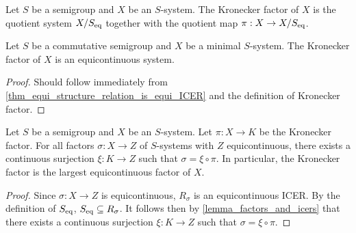 \begin{definition}
\label{def_kronecker_factor}
    Let $S$ be a semigroup and $X$ be an $S$-system.  The Kronecker factor of $X$ is the quotient system $X/S_\text{eq}$ together with the quotient map $\pi: X \to X/S_\text{eq}$.
\end{definition}

\begin{theorem}
    \label{thm_kronecker_is_equicontinuous_system}
    Let $S$ be a commutative semigroup and $X$ be a minimal $S$-system. The Kronecker factor of $X$ is an equicontinuous system.
\end{theorem}

\begin{proof}
    Should follow immediately from \cref{thm_equi_structure_relation_is_equi_ICER} and the definition of Kronecker factor.
\end{proof}


\begin{theorem}
\label{thm_kronecker_factor_description}
    Let $S$ be a semigroup and $X$ be an $S$-system.  Let $\pi: X \to K$ be the Kronecker factor.  For all factors $\sigma: X \to Z$ of $S$-systems with $Z$ equicontinuous, there exists a continuous surjection $\xi: K \to Z$ such that $\sigma = \xi \circ \pi$.  In particular, the Kronecker factor is the largest equicontinuous factor of $X$.
\end{theorem}

\begin{proof}
    Since $\sigma: X \to Z$ is equicontinuous, $R_\sigma$ is an equicontinuous ICER.  By the definition of $S_\text{eq}$, $S_\text{eq} \subseteq R_\sigma$.  It follows then by \cref{lemma_factors_and_icers} that there exists a continuous surjection $\xi: K \to Z$ such that $\sigma = \xi \circ \pi$.
\end{proof}


